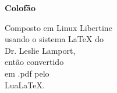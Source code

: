 \vspace*{\fill}
	\begin{flushright}
	{\Large\textbf{Colofão}}

	{\large 
	Composto em Linux Libertine \\
	usando o sistema \LaTeX{} do \\
	Dr. Leslie Lamport, \\
	então convertido \\
	em .pdf pelo \\
	Lua\LaTeX. \\}
	\end{flushright}
